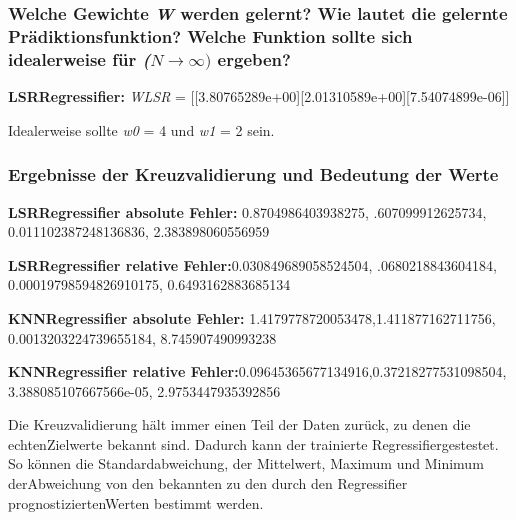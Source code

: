 \subsubsection{Welche Gewichte \textit{W} werden gelernt? Wie lautet die gelernte Prädiktionsfunktion? Welche Funktion sollte sich idealerweise für \textit{($N \rightarrow \infty)$} ergeben?}

\noindent
\textbf{LSRRegressifier: } \textit{W\textunderscore LSR} = [[3.80765289e+00][2.01310589e+00][7.54074899e-06]]
 
\vspace{5px}
\noindent
Idealerweise sollte \textit{w0} = 4 und \textit{w1} = 2 sein.
\subsubsection{ Ergebnisse der Kreuzvalidierung und Bedeutung der Werte }

\vspace{5px}
\noindent
\textbf{LSRRegressifier absolute Fehler: }0.8704986403938275, .607099912625734, 0.011102387248136836, 2.383898060556959 

\vspace{5px}
\noindent
\textbf{LSRRegressifier relative Fehler:}0.030849689058524504, .0680218843604184, 0.00019798594826910175, 0.6493162883685134

\vspace{5px}
\noindent
\textbf{KNNRegressifier absolute Fehler: }1.4179778720053478,1.411877162711756, 0.0013203224739655184, 8.745907490993238

\vspace{5px}
\noindent
\textbf{KNNRegressifier relative Fehler:}0.09645365677134916,0.37218277531098504, 3.388085107667566e-05, 2.9753447935392856

\vspace{5px}
\noindent
Die Kreuzvalidierung hält immer einen Teil der Daten zurück, zu denen die \dq echten\dq Zielwerte bekannt sind. Dadurch kann der trainierte Regressifiergestestet. 
So können die Standardabweichung, der Mittelwert, Maximum und Minimum derAbweichung von den bekannten zu den durch den Regressifier prognostiziertenWerten bestimmt werden. 

 